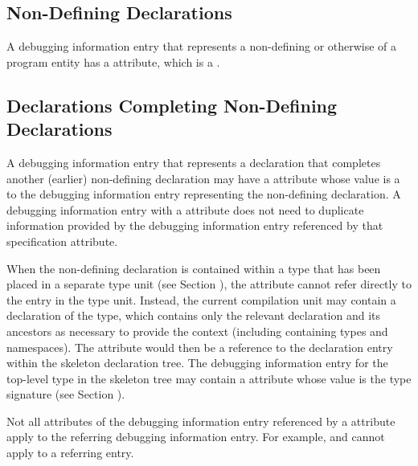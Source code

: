 \subsection{Non-Defining Declarations}
A debugging information entry that 
represents a non-defining 
or otherwise 
of a program entity has a
\DWATdeclaration{} attribute, which is a 
.

\subsection{Declarations Completing Non-Defining Declarations}
A debugging information entry that represents a 
declaration\hypertarget{chap:DWATspecificationincompletenondefiningorseparatedeclaration}{}
that completes another (earlier) non-defining declaration may have a 
\DWATspecification{}
attribute whose value is a  to
the debugging information entry representing the non-defining declaration. 
A debugging information entry with a 
\DWATspecification{} 
attribute does not need to duplicate information provided by the 
debugging information entry referenced by that specification attribute.

When the non-defining declaration is contained within a type that has
been placed in a separate type unit (see Section ), 
the \DWATspecification{} attribute cannot refer directly to the entry in
the type unit. Instead, the current compilation unit may contain a
 declaration of the type, which contains only the relevant
declaration and its ancestors as necessary to provide the context
(including containing types and namespaces). The \DWATspecification{}
attribute would then be a reference to the declaration entry within
the skeleton declaration tree. The debugging information entry for the
top-level type in the skeleton tree may contain a \DWATsignature{}
attribute whose value is the type signature 
(see Section ).


Not all attributes of the debugging information entry referenced by a
\DWATspecification{} attribute 
apply to the referring debugging information entry.
For
example,
\DWATsibling{} and 
\DWATdeclaration{} 
cannot apply to a 
referring
entry.



